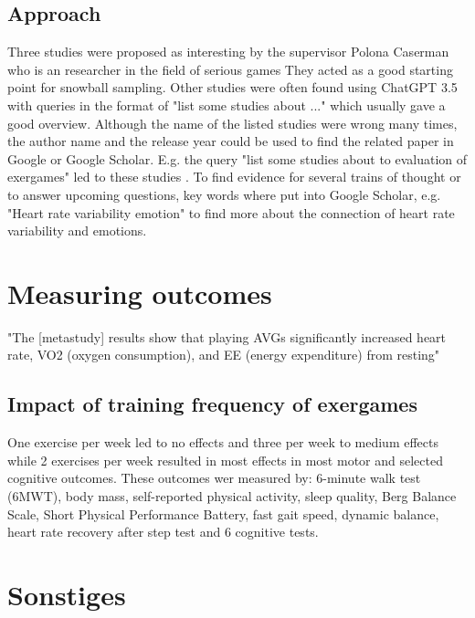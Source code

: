 \section{Approach}
Three studies were proposed as interesting by the supervisor Polona Caserman who is an researcher in the field of serious games They acted as a good starting point for snowball sampling.
Other studies were often found using ChatGPT 3.5 with queries in the format of "list some studies about ..." which usually gave a good overview. Although the name of the listed studies were wrong many times, the author name and the release year could be used to find the related paper in Google or Google Scholar. 
E.g. the query "list some studies about to evaluation of exergames" led to these studies \cite{fogel2010effects} \cite{lai2013effects}.
To find evidence for several trains of thought or to answer upcoming questions, key words where put into Google Scholar, e.g. "Heart rate variability emotion" to find more about the connection of heart rate variability and emotions.

\chapter{Measuring outcomes}
"The [metastudy] results show that playing AVGs significantly increased heart rate, VO2 (oxygen consumption), and EE (energy expenditure) from resting" \cite{peng2011playing}

\section{Impact of training frequency of exergames}
One exercise per week led to no effects and three per week to medium effects while 2 exercises per week resulted in most effects  in most motor and selected cognitive outcomes. These outcomes wer measured by: 6-minute walk test (6MWT), body mass, self-reported physical activity, sleep quality, Berg Balance Scale, Short Physical Performance Battery, fast gait speed, dynamic balance, heart rate recovery after step test and 6 cognitive tests. \cite{hortobagyi2012effects}

\chapter{Sonstiges}

